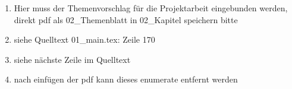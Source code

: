 \documentclass[12pt, a4paper]{report}
\begin{document}
\setlength{\parindent}{0pt} %
\renewcommand{\cftchapleader}{\cftdotfill{\cftdotsep}} %
\setlength{\cftbeforetoctitleskip}{0pt} %
\setlength{\cftbeforeloftitleskip}{0pt} %
\setlength{\cftbeforelottitleskip}{0pt} %
\setlength{\cftafterloftitleskip}{12pt} %
\setlength{\cftafterlottitleskip}{12pt} %
\setlength{\cftaftertoctitleskip}{12pt} %
\renewcommand{\cfttoctitlefont}{\Large\bfseries} %
\renewcommand{\cftloftitlefont}{\Large\bfseries} %
\renewcommand{\cftlottitlefont}{\Large\bfseries} %
\renewcommand{\chaptermark}[1]{%
  \markboth{\thechapter.\ #1}{}%
} %
\begin{titlepage}
    \clearpage
\end{titlepage}
\begin{enumerate}[nosep]
	\item Hier muss der Themenvorschlag für die Projektarbeit eingebunden werden, direkt pdf als 02\_Themenblatt in 02\_Kapitel speichern bitte
	\item siehe Quelltext 01\_main.tex: Zeile 170
	\item siehe nächste Zeile im Quelltext  \verb||
	\item nach einfügen der pdf kann dieses enumerate entfernt werden
\end{enumerate}
\clearpage
\pagestyle{projektarbeit}
\tableofcontents
    \clearpage
\listoffigures
    \clearpage
\listoftables
    \clearpage
\end{document}
